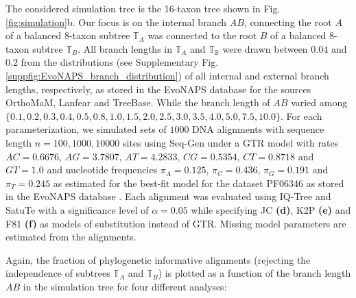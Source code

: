 \begin{appendices}
\medskip

\noindent The considered simulation tree is the 16-taxon tree shown in Fig.\,\ref{fig:simulation}b. Our focus is on the internal branch $AB$, connecting the root $A$ of a balanced $8$-taxon subtree $\mathbb{T}_A$ was connected to the root $B$ of a balanced $8$-taxon subtree $\mathbb{T}_B$. All branch lengths in $\mathbb{T}_A$ and $\mathbb{T_B}$ were drawn between $0.04$ and $0.2$ from the distributions (see Supplementary Fig.\,\ref{suppfig:EvoNAPS_branch_distribution}) of all internal and external branch lengths, respectively, as stored in the EvoNAPS database  for the sources OrthoMaM, Lanfear and TreeBase. While the branch length of $AB$ varied among $\{0.1, 0.2, 0.3, 0.4, 0.5, 0.8, 1.0, 1.5, 2.0, 2.5, 3.0, 3.5, 4.0, 5.0, 7.5, 10.0\}$. For each parameterization, we simulated sets of $1000$ DNA alignments with sequence length ${n = 100, 1000, 10000}$ sites using Seq-Gen  under a GTR model with rates $AC=0.6676$, $AG=3.7807$, $AT=4.2833$, $CG=0.5354$, $CT=0.8718$ and $GT=1.0$ and nucleotide frequencies $\pi_A = 0.125$, $\pi_C = 0.436$, $\pi_G = 0.191$ and $\pi_T =0.245$ as estimated for the best-fit model for the dataset PF06346 as stored in the EvoNAPS database . Each alignment was evaluated using IQ-Tree  and SatuTe with a significance level of $\alpha = 0.05$ while specifying JC \textbf{(d)}, K2P \textbf{(e)} and F81 \textbf{(f)} as models of substitution instead of GTR. Missing model parameters are estimated from the alignments.

\medskip
Again, the fraction of phylogenetic informative alignments (rejecting the independence of subtrees $\mathbb{T}_A$ and $\mathbb{T}_B$) is plotted as a function of the branch length $AB$ in the simulation tree for four different analyses:

\medskip


\end{appendices}
